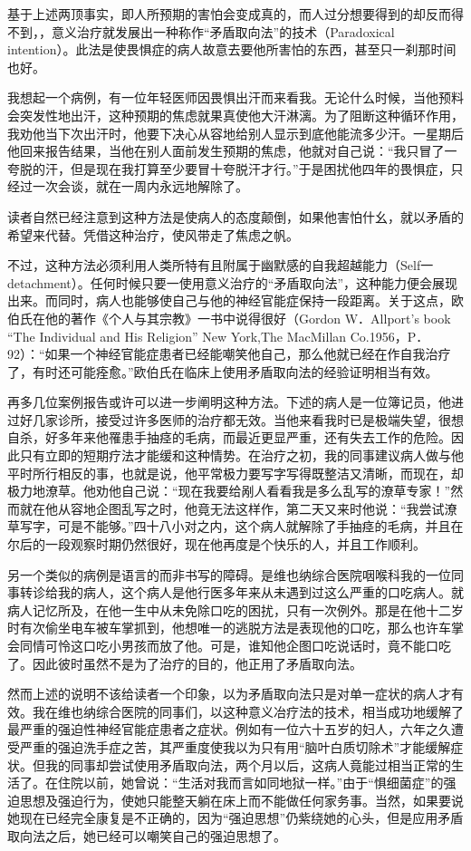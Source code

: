 \documentclass[11pt,oneside]{book}
\begin{document}
\begin{common-format}
基于上述两顶事实，即人所预期的害怕会变成真的，而人过分想要得到的却反而得不到，，意义治疗就发展出一种称作“矛盾取向法”的技术（Paradoxical intention）。此法是使畏惧症的病人故意去要他所害怕的东西，甚至只一刹那时间也好。

我想起一个病例，有一位年轻医师因畏惧出汗而来看我。无论什么时候，当他预料会突发性地出汗，这种预期的焦虑就果真使他大汗淋漓。为了阻断这种循环作用，我劝他当下次出汗时，他要下决心从容地给别人显示到底他能流多少汗。一星期后他回来报告结果，当他在别人面前发生预期的焦虑，他就对自己说：“我只冒了一夸脱的汗，但是现在我打算至少要冒十夸脱汗才行。”于是困扰他四年的畏惧症，只经过一次会谈，就在一周内永远地解除了。

读者自然已经注意到这种方法是使病人的态度颠倒，如果他害怕什幺，就以矛盾的希望来代替。凭借这种治疗，使风带走了焦虑之帆。

不过，这种方法必须利用人类所特有且附属于幽默感的自我超越能力（Self一detachment）。任何时候只要一使用意义治疗的“矛盾取向法”，这种能力便会展现出来。而同时，病人也能够使自己与他的神经官能症保持一段距离。关于这点，欧伯氏在他的著作《个人与其宗教》一书中说得很好（Gordon W．Allport's book “The Individual and His Religion” New York,The MacMillan Co.1956，P．92）：“如果一个神经官能症患者已经能嘲笑他自己，那么他就已经在作自我治疗了，有时还可能痊愈。”欧伯氏在临床上使用矛盾取向法的经验证明相当有效。

再多几位案例报告或许可以进一步阐明这种方法。下述的病人是一位簿记员，他进过好几家诊所，接受过许多医师的治疗都无效。当他来看我时已是极端失望，很想自杀，好多年来他罹患手抽痉的毛病，而最近更显严重，还有失去工作的危险。因此只有立即的短期疗法才能缓和这种情势。在治疗之初，我的同事建议病人做与他平时所行相反的事，也就是说，他平常极力要写字写得既整洁又清晰，而现在，却极力地潦草。他劝他自己说：“现在我要给剐人看看我是多么乱写的潦草专家！”然而就在他从容地企图乱写之时，他竟无法这样作，第二天又来时他说：“我尝试潦草写字，可是不能够。”四十八小对之内，这个病人就解除了手抽痉的毛病，并且在尔后的一段观察时期仍然很好，现在他再度是个快乐的人，并且工作顺利。

另一个类似的病例是语言的而非书写的障碍。是维也纳综合医院咽喉科我的一位同事转诊给我的病人，这个病人是他行医多年来从未遇到过这么严重的口吃病人。就病人记忆所及，在他一生中从未免除口吃的困扰，只有一次例外。那是在他十二岁时有次偷坐电车被车掌抓到，他想唯一的逃脱方法是表现他的口吃，那么也许车掌会同情可怜这口吃小男孩而放了他。可是，谁知他企图口吃说话时，竟不能口吃了。因此彼时虽然不是为了治疗的目的，他正用了矛盾取向法。

然而上述的说明不该给读者一个印象，以为矛盾取向法只是对单一症状的病人才有效。我在维也纳综合医院的同事们，以这种意义冶疗法的技术，相当成功地缓解了最严重的强迫性神经官能症患者之症状。例如有一位六十五岁的妇人，六年之久遭受严重的强迫洗手症之苦，其严重度使我以为只有用“脑叶白质切除术”才能缓解症状。但我的同事却尝试使用矛盾取向法，两个月以后，这病人竟能过相当正常的生活了。在住院以前，她曾说：“生活对我而言如同地狱一样。”由于“惧细菌症”的强迫思想及强迫行为，使她只能整天躺在床上而不能做任何家务事。当然，如果要说她现在已经完全康复是不正确的，因为“强迫思想”仍紫绕她的心头，但是应用矛盾取向法之后，她已经可以嘲笑自己的强迫思想了。


\end{common-format}
\end{document}
